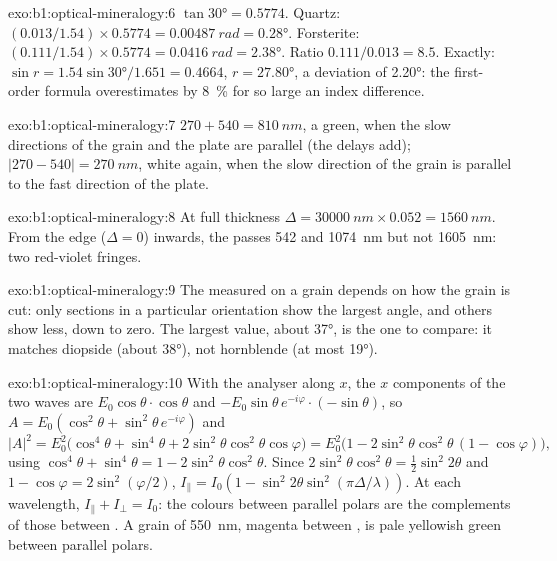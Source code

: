 \begin{solution}{exo:b1:optical-mineralogy:6}
$\tan\ang{30} = 0.5774$. Quartz: $(0.013/1.54)\times0.5774 = \qty{0.00487}{rad}
= \ang{0.28}$. Forsterite: $(0.111/1.54)\times0.5774 = \qty{0.0416}{rad} =
\ang{2.38}$. Ratio $0.111/0.013 = 8.5$. Exactly: $\sin r = 1.54\sin\ang{30}/1.651
= 0.4664$, $r = \ang{27.80}$, a deviation of \ang{2.20}: the first-order
formula overestimates by \qty{8}{\percent} for so large an index difference.
\end{solution}

\begin{solution}{exo:b1:optical-mineralogy:7}
$270 + 540 = \qty{810}{nm}$, a  green, when the slow directions of
the grain and the plate are parallel (the delays add); $|270 - 540| =
\qty{270}{nm}$,  white again, when the slow direction of the grain
is parallel to the fast direction of the plate.
\end{solution}

\begin{solution}{exo:b1:optical-mineralogy:8}
At full thickness $\Delta = \qty{30000}{nm}\times0.052 = \qty{1560}{nm}$. From
the edge ($\Delta = 0$) inwards, the  passes 542 and
\qty{1074}{nm} but not \qty{1605}{nm}: two red-violet fringes.
\end{solution}

\begin{solution}{exo:b1:optical-mineralogy:9}
The  measured on a grain depends on how the grain is cut:
only sections in a particular orientation show the largest angle, and others
show less, down to zero. The largest value, about \ang{37}, is the one to
compare: it matches diopside (about \ang{38}), not hornblende (at most
\ang{19}).
\end{solution}

\begin{solution}{exo:b1:optical-mineralogy:10}
With the analyser along $x$, the $x$ components of the two waves are
$E_0\cos\theta\cdot\cos\theta$ and $-E_0\sin\theta\,e^{-i\varphi}\cdot(-\sin\theta)$,
so $A = E_0(\cos^2\theta + \sin^2\theta\,e^{-i\varphi})$ and
\[
  |A|^2 = E_0^2\bigl(\cos^4\theta + \sin^4\theta + 2\sin^2\theta\cos^2\theta\cos\varphi\bigr)
  = E_0^2\bigl(1 - 2\sin^2\theta\cos^2\theta\,(1 - \cos\varphi)\bigr),
\]
using $\cos^4\theta + \sin^4\theta = 1 - 2\sin^2\theta\cos^2\theta$. Since
$2\sin^2\theta\cos^2\theta = \frac12\sin^2 2\theta$ and $1 - \cos\varphi =
2\sin^2(\varphi/2)$, $I_\parallel = I_0(1 - \sin^2 2\theta\sin^2(\pi\Delta/\lambda))$.
At each wavelength, $I_\parallel + I_\perp = I_0$: the colours between parallel
polars are the complements of those between . A grain of
\qty{550}{nm}, magenta between , is pale yellowish green
between parallel polars.
\end{solution}

